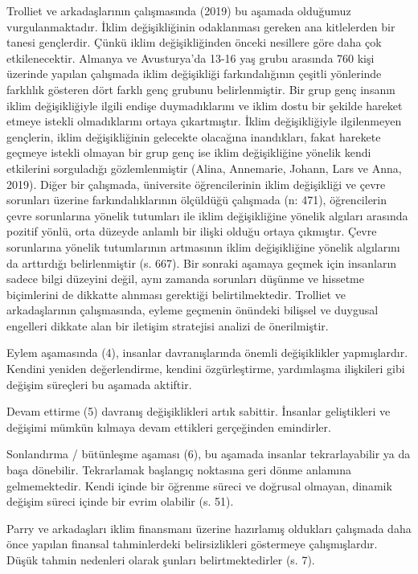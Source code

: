 \documentclass[
]{book}
\begin{document}
Trolliet ve arkadaşlarının çalışmasında (2019) bu aşamada olduğumuz vurgulanmaktadır.
İklim değişikliğinin odaklanması gereken ana kitlelerden bir tanesi gençlerdir. Çünkü iklim değişikliğinden önceki nesillere göre daha çok etkilenecektir. Almanya ve Avusturya'da 13-16 yaş grubu arasında 760 kişi üzerinde yapılan çalışmada iklim değişikliği farkındalığının çeşitli yönlerinde farklılık gösteren dört farklı genç grubunu belirlenmiştir. Bir grup genç insanın iklim değişikliğiyle ilgili endişe duymadıklarını ve iklim dostu bir şekilde hareket etmeye istekli olmadıklarını ortaya çıkartmıştır. İklim değişikliğiyle ilgilenmeyen gençlerin, iklim değişikliğinin gelecekte olacağına inandıkları, fakat harekete geçmeye istekli olmayan bir grup genç ise iklim değişikliğine yönelik kendi etkilerini sorguladığı gözlemlenmiştir (Alina, Annemarie, Johann, Lars ve Anna, 2019). Diğer bir çalışmada, üniversite öğrencilerinin iklim değişikliği ve çevre sorunları üzerine farkındalıklarının ölçüldüğü çalışmada (n: 471), öğrencilerin çevre sorunlarına yönelik tutumları ile iklim değişikliğine yönelik algıları arasında pozitif yönlü, orta düzeyde anlamlı bir ilişki olduğu ortaya çıkmıştır. Çevre sorunlarına yönelik tutumlarının artmasının iklim değişikliğine yönelik algılarını da arttırdığı belirlenmiştir (s. 667). \citep{sen2018universite} Bir sonraki aşamaya geçmek için insanların sadece bilgi düzeyini değil, aynı zamanda sorunları düşünme ve hissetme biçimlerini de dikkatte alınması gerektiği belirtilmektedir. Trolliet ve arkadaşlarının \citep{trolliet2019awareness} çalışmasında, eyleme geçmenin önündeki bilişsel ve duygusal engelleri dikkate alan bir iletişim stratejisi analizi de önerilmiştir.

Eylem aşamasında (4), insanlar davranışlarında önemli değişiklikler yapmışlardır. Kendini yeniden değerlendirme, kendini özgürleştirme, yardımlaşma ilişkileri gibi değişim süreçleri bu aşamada aktiftir.

Devam ettirme (5) davranış değişiklikleri artık sabittir. İnsanlar geliştikleri ve değişimi mümkün kılmaya devam ettikleri gerçeğinden emindirler.

Sonlandırma / bütünleşme aşaması (6), bu aşamada insanlar tekrarlayabilir ya da başa dönebilir. Tekrarlamak başlangıç noktasına geri dönme anlamına gelmemektedir. Kendi içinde bir öğrenme süreci ve doğrusal olmayan, dinamik değişim süreci içinde bir evrim olabilir (s. 51). \citep{trolliet2019awareness}

Parry ve arkadaşları iklim finansmanı üzerine hazırlamış oldukları çalışmada daha önce yapılan finansal tahminlerdeki belirsizlikleri göstermeye çalışmışlardır. Düşük tahmin nedenleri olarak şunları belirtmektedirler (s. 7). \citep{parry2009assessing}
\end{document}
